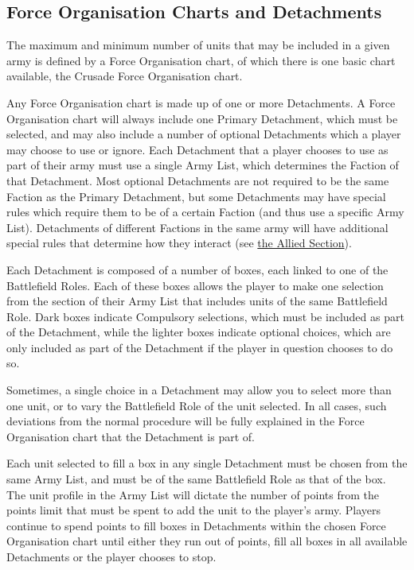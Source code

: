 \newpage
\begin{multicols}{2}
\subsection{Force Organisation Charts and Detachments}

The maximum and minimum number of units that may be included in a given army is defined by a Force Organisation chart, of which there is one basic chart available, the Crusade Force Organisation chart. 

Any Force Organisation chart is made up of one or more Detachments. A Force Organisation chart will always include one Primary Detachment, which must be selected, and may also include a number of optional Detachments which a player may choose to use or ignore. Each Detachment that a player chooses to use as part of their army must use a single Army List, which determines the Faction of that Detachment. Most optional Detachments are not required to be the same Faction as the Primary Detachment, but some Detachments may have special rules which require them to be of a certain Faction (and thus use a specific Army List). Detachments of different Factions in the same army will have additional special rules that determine how they interact (see \hyperref[allies]{the Allied Section}).

Each Detachment is composed of a number of boxes, each linked to one of the Battlefield Roles. Each of these boxes allows the player to make one selection from the section of their Army List that includes units of the same Battlefield Role. Dark boxes indicate Compulsory selections, which must be included as part of the Detachment, while the lighter boxes indicate optional choices, which are only included as part of the Detachment if the player in question chooses to do so.

Sometimes, a single choice in a Detachment may allow you to select more than one unit, or to vary the Battlefield Role of the unit selected. In all cases, such deviations from the normal procedure will be fully explained in the Force Organisation chart that the Detachment is part of.
 
Each unit selected to fill a box in any single Detachment must be chosen from the same Army List, and must be of the same Battlefield Role as that of the box. The unit profile in the Army List will dictate the number of points from the points limit that must be spent to add the unit to the player’s army. Players continue to spend points to fill boxes in Detachments within the chosen Force Organisation chart until either they run out of points, fill all boxes in all available Detachments or the player chooses to stop.


\end{multicols}
